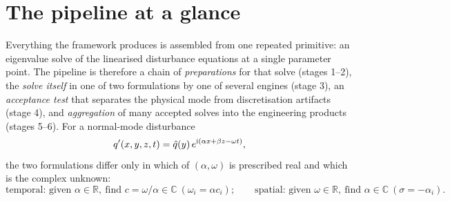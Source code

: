 \documentclass[11pt]{article}
\begin{document}
\section{The pipeline at a glance}\label{sec:pipeline}
Everything the framework produces is assembled from one repeated primitive: an eigenvalue solve
of the linearised disturbance equations at a single parameter point. The pipeline is therefore a
chain of \emph{preparations} for that solve (stages 1--2), the \emph{solve itself} in one of two
formulations by one of several engines (stage 3), an \emph{acceptance test} that separates the
physical mode from discretisation artifacts (stage 4), and \emph{aggregation} of many accepted
solves into the engineering products (stages 5--6). For a normal-mode disturbance
\cite{mack1984,schmid2001}
\begin{equation}\label{eq:ansatz}
  q'(x,y,z,t)=\hat{q}(y)\,e^{\mathrm{i}(\alpha x+\beta z-\omega t)},
\end{equation}
the two formulations differ only in which of $(\alpha,\omega)$ is prescribed real and which is
the complex unknown:
\begin{equation}\label{eq:formulations}
  \text{temporal: given }\alpha\in\mathbb R,\ \text{find }c=\omega/\alpha\in\mathbb C
  \ (\omega_i=\alpha c_i);\qquad
  \text{spatial: given }\omega\in\mathbb R,\ \text{find }\alpha\in\mathbb C\ (\sigma=-\alpha_i).
\end{equation}
\end{document}
